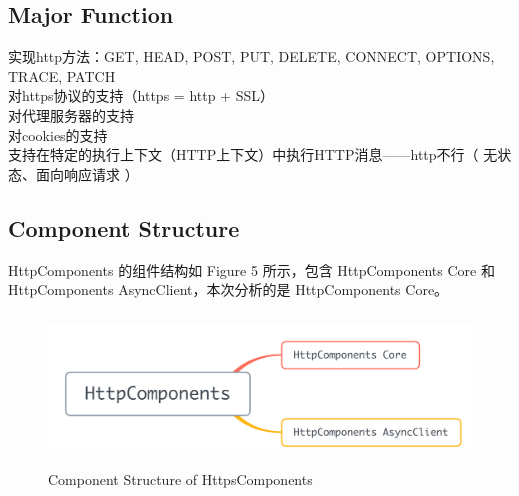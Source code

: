 \documentclass{article}
\begin{document}
	\subsection{Major Function}
	\begin{CJK}{UTF8}{gbsn}
		实现http方法：GET, HEAD, POST, PUT, DELETE, CONNECT, OPTIONS, TRACE, PATCH\\
		对https协议的支持（https = http + SSL）\\
		对代理服务器的支持\\
		对cookies的支持\\
		支持在特定的执行上下文（HTTP上下文）中执行HTTP消息——http不行（ 无状态、面向响应请求 ） \\
	\end{CJK}{}
	\subsection{Component Structure}
	\begin{CJK}{UTF8}{gbsn}
		HttpComponents 的组件结构如 Figure 5 所示，包含 HttpComponents Core 和 HttpComponents AsyncClient，本次分析的是 HttpComponents Core。\\
	\end{CJK}{}
	\begin{figure}[H]
		\centering
		\includegraphics[height = 4cm, width = 12cm]{pics/6_httpcomponents_structure.png}	
		\caption{Component Structure of HttpsComponents}
	\end{figure}
\end{document}
